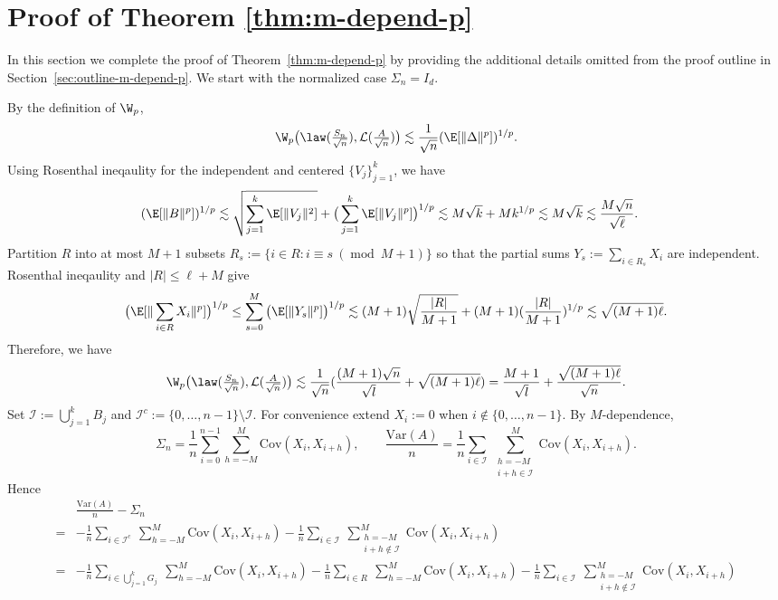 \documentclass[mnsc,nonblindrev]{informs3}
\begin{document}
\section{Proof of Theorem \ref{thm:m-depend-p}}\label{sec:m-depend-p}
In this section we complete the proof of Theorem~\ref{thm:m-depend-p} by providing   the additional details
omitted from the proof outline in Section~\ref{sec:outline-m-depend-p}. We start with the normalized case $\Sigma_n = I_d$.

By the definition of $\W_p$,
\begin{equation*}
\W_p\big(\law(\tfrac{S_n}{\sqrt{n}}),\mathcal{L}(\tfrac{A}{\sqrt{n}})\big)
\lesssim \frac{1}{\sqrt{n}}
(\E[\|\Delta\|^p])^{1/p}.
\end{equation*}
Using Rosenthal ineqaulity for the independent and centered $\{V_j\}_{j=1}^k$, we have 
\begin{align*}
(\E[\|B\|^p])^{1/p}\lesssim  \sqrt{\sum_{j=1}^k\E[\|V_j\|^2]}
+ \big(\sum_{j=1}^k\E[\|V_j\|^p]\big)^{1/p}
&\lesssim M\sqrt{k}+Mk^{1/p}\lesssim M \sqrt{k} \lesssim \frac{M\sqrt{n}}{\sqrt{\ell}}.
\end{align*}
Partition $R$ into at most $M+1$ subsets $R_s:=\{i \in R: i \equiv s~(\operatorname{mod}~ M+1)\} $ so that the partial sums $Y_s:= \sum_{i \in R_s}X_i$ are independent. Rosenthal ineqaulity and $|R| \leq \ell+M$ give
\begin{equation*}
\big(\E[\|\sum_{i \in R}X_i\|^p]\big)^{1/p} \le \sum_{s=0}^{M}\big(\E[\|Y_s\|^p]\big)^{1/p}\lesssim (M+1)\sqrt{\frac{|R|}{M+1}}+(M+1)(\frac{|R|}{M+1})^{1/p}\lesssim \sqrt{(M+1)\ell}.
\end{equation*}
Therefore, we have
\begin{equation}\label{eq:step2}
\W_p\big(\law(\tfrac{S_n}{\sqrt{n}}),\mathcal{L}(\tfrac{A}{\sqrt{n}})\big)
\lesssim \frac{1}{\sqrt{n}}(\frac{(M+1)\sqrt{n}}{\sqrt{l}}+\sqrt{(M+1)\ell})= \frac{M+1}{\sqrt{l}} + \frac{\sqrt{(M+1)\ell}}{\sqrt{n}}.
\end{equation}
Set $\mathcal{I}:=\bigcup_{j=1}^k B_j$ and $\mathcal{I}^c:=\{0,\dots,n-1\}\setminus\mathcal{I}$.
For convenience extend $X_i:=0$ when $i\notin\{0,\dots,n-1\}$.
By $M$-dependence,
\[
\Sigma_n=\frac{1}{n}\sum_{i=0}^{n-1}\sum_{h=-M}^M \mathrm{Cov}(X_i,X_{i+h}),\qquad
\frac{\mathrm{Var}(A)}{n}=\frac{1}{n}\sum_{i\in\mathcal{I}}\ \sum_{\substack{h=-M\\ i+h\in\mathcal{I}}}^M \mathrm{Cov}(X_i,X_{i+h}).
\]
Hence
\begin{align*}
&\frac{\mathrm{Var}(A)}{n}-\Sigma_n\\
=&-\frac{1}{n}\sum_{i\in\mathcal{I}^c}\ \sum_{h=-M}^M\mathrm{Cov}(X_i,X_{i+h})
-\frac{1}{n}\sum_{i\in\mathcal{I}}\ \sum_{\substack{h=-M\\ i+h\notin\mathcal{I}}}^M \mathrm{Cov}(X_i,X_{i+h})\\
=&-\frac{1}{n}\sum_{i\in\bigcup_{j=1}^k G_j}\ \sum_{h=-M}^M\mathrm{Cov}(X_i,X_{i+h})-\frac{1}{n}\sum_{i\in R}\ \sum_{h=-M}^M\mathrm{Cov}(X_i,X_{i+h})
-\frac{1}{n}\sum_{i\in\mathcal{I}}\ \sum_{\substack{h=-M\\ i+h\notin\mathcal{I}}}^M \mathrm{Cov}(X_i,X_{i+h})
\end{align*}
\end{document}
